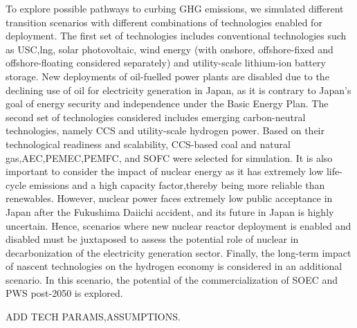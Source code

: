 To explore possible pathways to curbing \gls{GHG} emissions, we simulated different transition scenarios with different combinations of technologies enabled for deployment. The first set of technologies includes conventional technologies such as  \gls{USC},\gls{lng}, solar photovoltaic, wind energy (with onshore, offshore-fixed and offshore-floating considered separately) and utility-scale lithium-ion battery storage. New deployments of oil-fuelled power plants are disabled due to the declining use of oil for electricity generation in Japan, as it is contrary to Japan's goal of energy security and independence under the Basic Energy Plan. The second set of technologies considered includes emerging carbon-neutral technologies, namely \gls{CCS} and utility-scale hydrogen power. Based on their technological readiness and scalability, \gls{CCS}-based coal and natural gas,\gls{AEC},\gls{PEMEC},\gls{PEMFC}, and \gls{SOFC} were selected for simulation. It is also important to consider the impact of nuclear energy as it has extremely low life-cycle emissions and a high capacity factor,thereby being more reliable than renewables. However, nuclear power faces extremely low public acceptance in Japan after the Fukushima Daiichi accident, and its future in Japan is highly uncertain. Hence, scenarios where new nuclear reactor deployment is enabled and disabled must be juxtaposed to assess the potential role of nuclear in decarbonization of the electricity generation sector. Finally, the long-term impact of nascent technologies on the hydrogen economy is considered in an additional scenario. In this scenario, the potential of the commercialization of \gls{SOEC} and \gls{PWS} post-2050 is explored.

ADD TECH PARAMS,ASSUMPTIONS.




